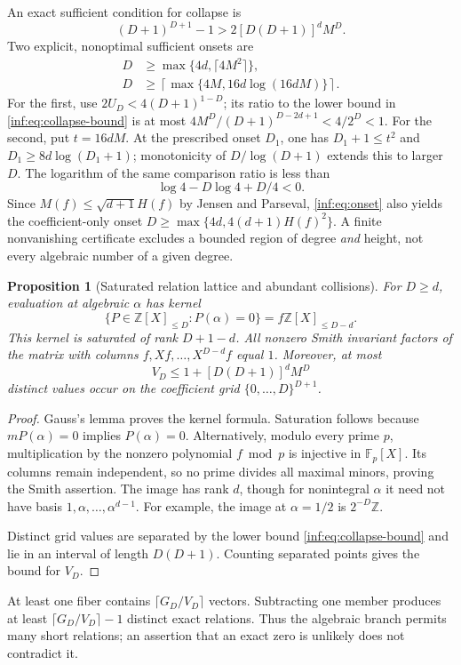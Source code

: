 \documentclass[11pt,a4paper]{article}
\newcommand{\Z}{\mathbb Z}
\newtheorem{proposition}[theorem]{Proposition}
\theoremstyle{definition}
\theoremstyle{remark}
\numberwithin{equation}{section}
\begin{document}
An exact sufficient condition for collapse is
\[
 (D+1)^{D+1}-1>2[D(D+1)]^dM^D.
\]
Two explicit, nonoptimal sufficient onsets are
\begin{align}
 D&\ge\max\{4d,\lceil4M^2\rceil\},\label{inf:eq:onset}\\
 D&\ge\left\lceil\max\{4M,16d\log(16dM)\}\right\rceil.\label{inf:eq:onset-linear}
\end{align}
For the first, use $2U_D<4(D+1)^{1-D}$; its ratio to the lower bound in \eqref{inf:eq:collapse-bound} is at most $4M^D/(D+1)^{D-2d+1}<4/2^D<1$. For the second, put $t=16dM$. At the prescribed onset $D_1$, one has $D_1+1\le t^2$ and $D_1\ge8d\log(D_1+1)$; monotonicity of $D/\log(D+1)$ extends this to larger $D$. The logarithm of the same comparison ratio is less than
\[
 \log4-D\log4+D/4<0.
\]
Since $M(f)\le\sqrt{d+1}H(f)$ by Jensen and Parseval, \eqref{inf:eq:onset} also yields the coefficient-only onset $D\ge\max\{4d,4(d+1)H(f)^2\}$. A finite nonvanishing certificate excludes a bounded region of degree \emph{and} height, not every algebraic number of a given degree.

\begin{proposition}[Saturated relation lattice and abundant collisions]\label{inf:prop:lattice}
For $D\ge d$, evaluation at algebraic $\alpha$ has kernel
\[
 \{P\in\Z[X]_{\le D}:P(\alpha)=0\}
   =f\Z[X]_{\le D-d}.
\]
This kernel is saturated of rank $D+1-d$. All nonzero Smith invariant factors of the matrix with columns $f,Xf,\ldots,X^{D-d}f$ equal $1$. Moreover, at most
\[
 V_D\le1+[D(D+1)]^dM^D
\]
distinct values occur on the coefficient grid $\{0,\ldots,D\}^{D+1}$.
\end{proposition}
\begin{proof}
Gauss's lemma proves the kernel formula. Saturation follows because $mP(\alpha)=0$ implies $P(\alpha)=0$. Alternatively, modulo every prime $p$, multiplication by the nonzero polynomial $f\bmod p$ is injective in $\mathbb F_p[X]$. Its columns remain independent, so no prime divides all maximal minors, proving the Smith assertion. The image has rank $d$, though for nonintegral $\alpha$ it need not have basis $1,\alpha,\ldots,\alpha^{d-1}$. For example, the image at $\alpha=1/2$ is $2^{-D}\Z$.

Distinct grid values are separated by the lower bound \eqref{inf:eq:collapse-bound} and lie in an interval of length $D(D+1)$. Counting separated points gives the bound for $V_D$.
\end{proof}
At least one fiber contains $\lceil G_D/V_D\rceil$ vectors. Subtracting one member produces at least $\lceil G_D/V_D\rceil-1$ distinct exact relations. Thus the algebraic branch permits many short relations; an assertion that an exact zero is unlikely does not contradict it.
\end{document}
